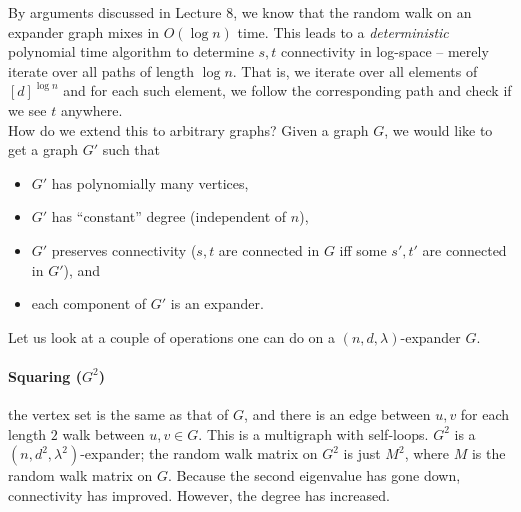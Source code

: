 			By arguments discussed in Lecture $8$, we know that the random walk on an expander graph mixes in $O(\log n)$ time. This leads to a \emph{deterministic} polynomial time algorithm to determine $s,t$ connectivity in log-space -- merely iterate over all paths of length $\log n$. That is, we iterate over all elements of $[d]^{\log n}$ and for each such element, we follow the corresponding path and check if we see $t$ anywhere.\\

			How do we extend this to arbitrary graphs? Given a graph $G$, we would like to get a graph $G'$ such that
			\begin{itemize}
				\item $G'$ has polynomially many vertices,
				\item $G'$ has ``constant'' degree (independent of $n$),
				\item $G'$ preserves connectivity ($s,t$ are connected in $G$ iff some $s',t'$ are connected in $G'$), and
				\item each component of $G'$ is an expander.
			\end{itemize}

			Let us look at a couple of operations one can do on a $(n,d,\lambda)$-expander $G$.

			\paragraph{Squaring ($G^2$)} the vertex set is the same as that of $G$, and there is an edge between $u,v$ for each length $2$ walk between $u,v \in G$. This is a multigraph with self-loops. $G^2$ is a $(n,d^2,\lambda^2)$-expander; the random walk matrix on $G^2$ is just $M^2$, where $M$ is the random walk matrix on $G$. Because the second eigenvalue has gone down, connectivity has improved. However, the degree has increased.

